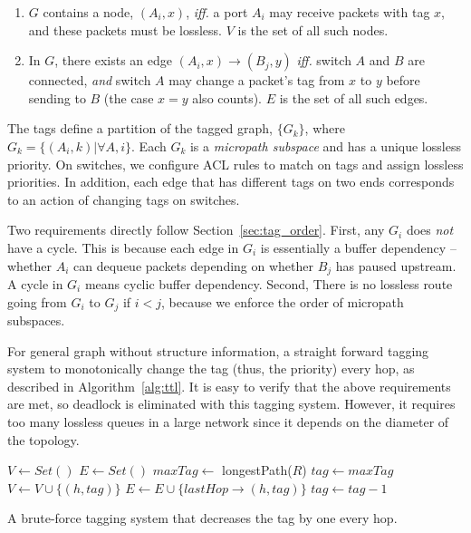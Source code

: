 \begin{enumerate}
\item $G$ contains a node, $(A_i, x)$, {\em iff.} a port $A_i$ may receive packets with tag $x$, and these packets must 
be lossless. $V$ is the set of all such nodes.
\item In $G$, there exists an edge $(A_i, x)\rightarrow(B_j, y)$ {\em iff.} switch $A$ and $B$ are 
connected, {\em and} switch $A$ may change a packet's tag from $x$ to $y$ before sending to $B$ (the case $x=y$ also counts).
$E$ is the set of all such edges.
\end{enumerate}


The tags define a partition of the tagged graph, $\{G_k\}$, 
where $G_k = \{(A_i, k) | \forall A, i\}$. Each $G_k$ is a {\em micropath subspace} and has a unique lossless priority.
On switches, we configure ACL rules to match on tags and assign lossless priorities.
In addition, each edge that has different tags on two ends corresponds to an action of changing tags on switches.

Two requirements directly follow Section~\ref{sec:tag_order}. First, any $G_i$ does {\em not} have a cycle. This is because
each edge in $G_i$ is essentially a buffer dependency -- whether $A_i$ can dequeue packets depending on whether $B_j$ 
has paused upstream. A cycle in $G_i$ means cyclic buffer dependency. Second, There is no lossless route going from 
$G_i$ to $G_j$ if $i<j$, because we enforce the order of micropath subspaces.


 For general graph without structure information, a straight forward tagging system
to monotonically change the tag (thus, the priority) every hop, as described in Algorithm~\ref{alg:ttl}. It is easy to 
verify that the above requirements are met, so deadlock is eliminated with this tagging system. However, it requires 
too many lossless queues in a large network since it depends on the diameter of the topology.

\begin{algorithm}
	\small
	$V \gets Set()$\;
	$E \gets Set()$\; 
	$maxTag \gets$ longestPath($R$)\;
	 {
		$tag \gets maxTag$\;
		 {
			$V \gets V \cup \{(h, tag)\}$\;
			$E \gets E \cup \{lastHop\rightarrow(h, tag)\}$\;
			$tag \gets tag-1$\;
		}
	}
	\;
    \caption{A brute-force tagging system that decreases the tag by one every hop.}
	\label{alg:ttl}
\end{algorithm}

